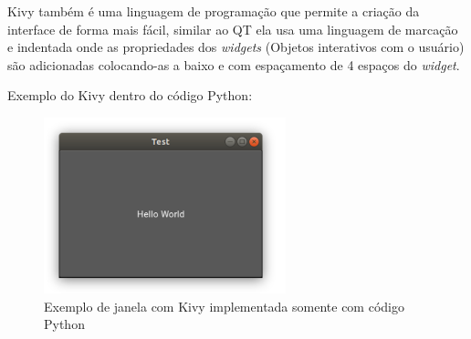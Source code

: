             Kivy também é uma linguagem de programação que permite a criação da interface de forma mais fácil, similar ao QT \cite{qt} ela usa uma linguagem de marcação e indentada onde as propriedades dos \textit{widgets} (Objetos interativos com o usuário) são adicionadas colocando-as a baixo e com espaçamento de 4 espaços do \textit{widget}. 
                        
            Exemplo do Kivy dentro do código Python:
            \begin{quote}
                                                                                 
            \end{quote}
            
            \begin{figure}[H]
                \caption{Exemplo de janela com Kivy implementada somente com código Python}
                \begin{center}
                    \includegraphics[width=7cm]{texto/fig/hello_world_kivy.png} 
                \end{center}
                \label{janela_kivy} 
            \end{figure}


